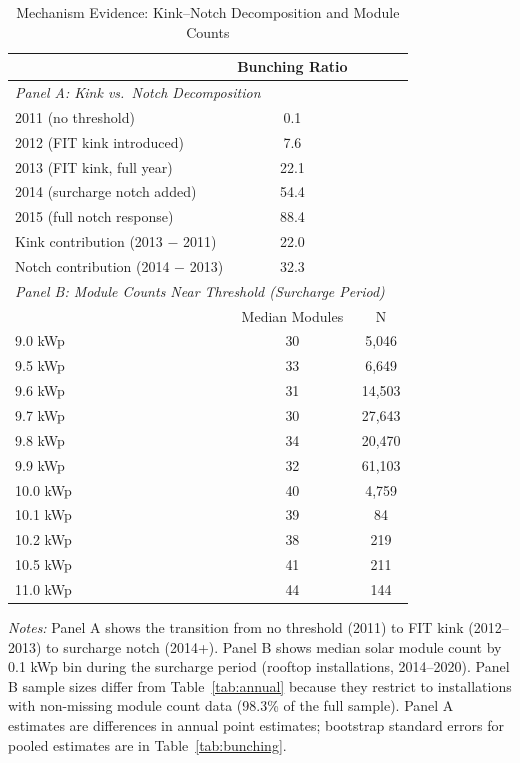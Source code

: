\begin{table}[t]
\centering
\caption{Mechanism Evidence: Kink--Notch Decomposition and Module Counts}
\label{tab:mechanism}
\begin{tabular}{lcc}
\toprule
 & Bunching Ratio & \\
\midrule
\multicolumn{3}{l}{\textit{Panel A: Kink vs.\ Notch Decomposition}} \\
2011 (no threshold) & 0.1 & \\
2012 (FIT kink introduced) & 7.6 & \\
2013 (FIT kink, full year) & 22.1 & \\
2014 (surcharge notch added) & 54.4 & \\
2015 (full notch response) & 88.4 & \\
\midrule
Kink contribution (2013 $-$ 2011) & 22.0 & \\
Notch contribution (2014 $-$ 2013) & 32.3 & \\
\midrule
\multicolumn{3}{l}{\textit{Panel B: Module Counts Near Threshold (Surcharge Period)}} \\
 & Median Modules & N \\
\midrule
9.0 kWp & 30 & 5,046 \\
9.5 kWp & 33 & 6,649 \\
9.6 kWp & 31 & 14,503 \\
9.7 kWp & 30 & 27,643 \\
9.8 kWp & 34 & 20,470 \\
9.9 kWp & 32 & 61,103 \\
10.0 kWp & 40 & 4,759 \\
10.1 kWp & 39 & 84 \\
10.2 kWp & 38 & 219 \\
10.5 kWp & 41 & 211 \\
11.0 kWp & 44 & 144 \\
\bottomrule
\end{tabular}

\vspace{0.5em}
\begin{flushleft}\small \textit{Notes:} Panel A shows the transition from no threshold (2011) to FIT kink (2012--2013) to surcharge notch (2014+). Panel B shows median solar module count by 0.1 kWp bin during the surcharge period (rooftop installations, 2014--2020). Panel B sample sizes differ from Table~\ref{tab:annual} because they restrict to installations with non-missing module count data (98.3\% of the full sample). Panel A estimates are differences in annual point estimates; bootstrap standard errors for pooled estimates are in Table~\ref{tab:bunching}.\end{flushleft}
\end{table}
